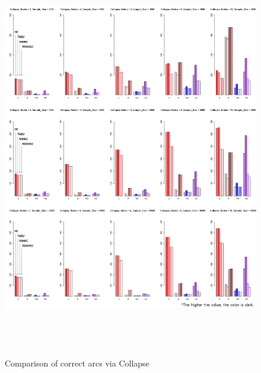 	\begin{figure}[p]
	\centering
		\includegraphics[height=500pt]{01_Collapse_Arcs}
		\caption{Comparison of correct arcs via Collapse}
	\end{figure}	

\newpage{}

